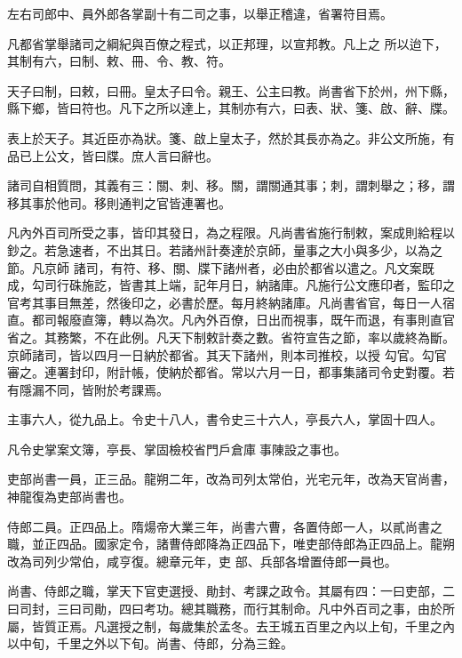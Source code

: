 \begin{pinyinscope}
 左右司郎中、員外郎各掌副十有二司之事，以舉正稽違，省署符目焉。



 凡都省掌舉諸司之綱紀與百僚之程式，以正邦理，以宣邦教。凡上之
 所以迨下，其制有六，曰制、敕、冊、令、教、符。



 天子曰制，曰敕，曰冊。皇太子曰令。親王、公主曰教。尚書省下於州，州下縣，縣下鄉，皆曰符也。凡下之所以達上，其制亦有六，曰表、狀、箋、啟、辭、牒。



 表上於天子。其近臣亦為狀。箋、啟上皇太子，然於其長亦為之。非公文所施，有品已上公文，皆曰牒。庶人言曰辭也。



 諸司自相質問，其義有三：關、刺、移。關，謂關通其事；刺，謂刺舉之；移，謂移其事於他司。移則通判之官皆連署也。



 凡內外百司所受之事，皆印其發日，為之程限。凡尚書省施行制敕，案成則給程以鈔之。若急速者，不出其日。若諸州計奏達於京師，量事之大小與多少，以為之節。凡京師
 諸司，有符、移、關、牒下諸州者，必由於都省以遣之。凡文案既成，勾司行硃施訖，皆書其上端，記年月日，納諸庫。凡施行公文應印者，監印之官考其事目無差，然後印之，必書於歷。每月終納諸庫。凡尚書省官，每日一人宿直。都司報廢直簿，轉以為次。凡內外百僚，日出而視事，既午而退，有事則直官省之。其務繁，不在此例。凡天下制敕計奏之數。省符宣告之節，率以歲終為斷。京師諸司，皆以四月一日納於都省。其天下諸州，則本司推校，以授
 勾官。勾官審之。連署封印，附計帳，使納於都省。常以六月一日，都事集諸司令史對覆。若有隱漏不同，皆附於考課焉。



 主事六人，從九品上。令史十八人，書令史三十六人，亭長六人，掌固十四人。



 凡令史掌案文簿，亭長、掌固檢校省門戶倉庫事陳設之事也。



 吏部尚書一員，正三品。龍朔二年，改為司列太常伯，光宅元年，改為天官尚書，神龍復為吏部尚書也。



 侍郎二員。正四品上。隋煬帝大業三年，尚書六曹，各置侍郎一人，以貳尚書之職，並正四品。國家定令，諸曹侍郎降為正四品下，唯吏部侍郎為正四品上。龍朔改為司列少常伯，咸亨復。總章元年，吏
 部、兵部各增置侍郎一員也。



 尚書、侍郎之職，掌天下官吏選授、勛封、考課之政令。其屬有四：一曰吏部，二曰司封，三曰司勛，四曰考功。總其職務，而行其制命。凡中外百司之事，由於所屬，皆質正焉。凡選授之制，每歲集於孟冬。去王城五百里之內以上旬，千里之內以中旬，千里之外以下旬。尚書、侍郎，分為三銓。




\end{pinyinscope}
